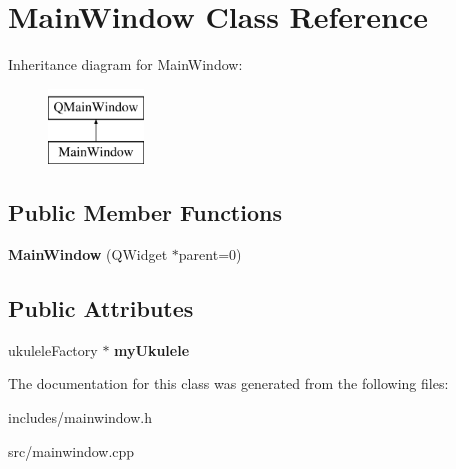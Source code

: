 \hypertarget{class_main_window}{}\section{Main\+Window Class Reference}
\label{class_main_window}
Inheritance diagram for Main\+Window\+:\begin{figure}[H]
\begin{center}
\leavevmode
\includegraphics[height=2.000000cm]{class_main_window}
\end{center}
\end{figure}
\subsection*{Public Member Functions}
\begin{DoxyCompactItemize}
\item 
\hypertarget{class_main_window_a8b244be8b7b7db1b08de2a2acb9409db}{}\label{class_main_window_a8b244be8b7b7db1b08de2a2acb9409db} 
{\bfseries Main\+Window} (Q\+Widget $\ast$parent=0)
\end{DoxyCompactItemize}
\subsection*{Public Attributes}
\begin{DoxyCompactItemize}
\item 
\hypertarget{class_main_window_a8d4e721515b396462f75f9daf98b3354}{}\label{class_main_window_a8d4e721515b396462f75f9daf98b3354} 
ukulele\+Factory $\ast$ {\bfseries my\+Ukulele}
\end{DoxyCompactItemize}


The documentation for this class was generated from the following files\+:\begin{DoxyCompactItemize}
\item 
includes/mainwindow.\+h\item 
src/mainwindow.\+cpp\end{DoxyCompactItemize}
